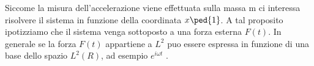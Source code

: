 \documentclass[12pt,a4paper]{article}
\begin{document}
		Siccome la misura dell'accelerazione viene effettuata sulla massa m ci interessa risolvere il sistema in funzione della coordinata $x\ped{1}$. A tal proposito ipotizziamo che il sistema venga sottoposto a una forza esterna $F(t) $. In generale se la forza $F(t)$ appartiene a  $L^2$ puo essere espressa in funzione di una base dello spazio $L^2(R)$, ad esempio $e^{i\omega t}$ .
 
 
 
\end{document}
